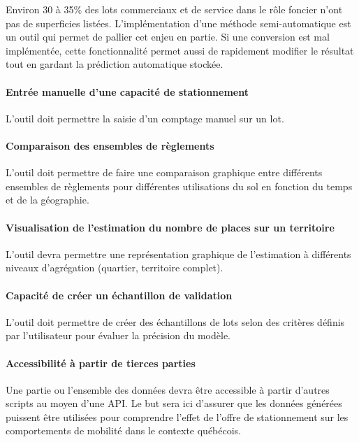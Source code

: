 Environ 30 à 35\% des lots commerciaux et de service dans le rôle foncier n'ont pas de superficies listées. L'implémentation d'une méthode semi-automatique est un outil qui permet de pallier cet enjeu en partie. Si une conversion est mal implémentée, cette fonctionnalité permet aussi de rapidement modifier le résultat tout en gardant la prédiction automatique stockée.

\paragraph{Entrée manuelle d'une capacité de stationnement}

L'outil doit permettre la saisie d'un comptage manuel sur un lot.

\paragraph{Comparaison des ensembles de règlements} 

L'outil doit permettre de faire une comparaison graphique entre différents ensembles de règlements pour différentes utilisations du sol en fonction du temps et de la géographie.
\paragraph{Visualisation de l'estimation du nombre de places sur un territoire}

L'outil devra permettre une représentation graphique de l’estimation à différents niveaux d'agrégation (quartier, territoire complet).
\paragraph{Capacité de créer un échantillon de validation}

L'outil doit permettre de créer des échantillons de lots selon des critères définis par l'utilisateur pour évaluer la précision du modèle.

\paragraph{Accessibilité à partir de tierces parties} 

Une partie ou l'ensemble des données devra être accessible à partir d'autres scripts au moyen d'une API. Le but sera ici d'assurer que les données générées puissent être utilisées pour comprendre l'effet de l'offre de stationnement sur les comportements de mobilité dans le contexte québécois.


